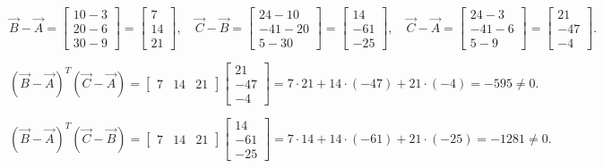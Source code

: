 \documentclass[journal]{IEEEtran}
\begin{document}
\begin{equation}
\vec{B}-\vec{A}
=\begin{bmatrix}10-3\\20-6\\30-9\end{bmatrix}
=\begin{bmatrix}7\\14\\21\end{bmatrix},
\quad
\vec{C}-\vec{B}
=\begin{bmatrix}24-10\\-41-20\\5-30\end{bmatrix}
=\begin{bmatrix}14\\-61\\-25\end{bmatrix},
\quad
\vec{C}-\vec{A}
=\begin{bmatrix}24-3\\-41-6\\5-9\end{bmatrix}
=\begin{bmatrix}21\\-47\\-4\end{bmatrix}.
\tag{2}
\end{equation}

\begin{equation}
(\vec{B}-\vec{A})^{\!T}(\vec{C}-\vec{A})
=
\begin{bmatrix}7&14&21\end{bmatrix}
\begin{bmatrix}21\\-47\\-4\end{bmatrix}
=
7\cdot21+14\cdot(-47)+21\cdot(-4)
=-595 \neq 0.
\tag{3}
\end{equation}

\begin{equation}
(\vec{B}-\vec{A})^{\!T}(\vec{C}-\vec{B})
=
\begin{bmatrix}7&14&21\end{bmatrix}
\begin{bmatrix}14\\-61\\-25\end{bmatrix}
=
7\cdot14+14\cdot(-61)+21\cdot(-25)
=-1281 \neq 0.
\tag{4}
\end{equation}
\end{document}
